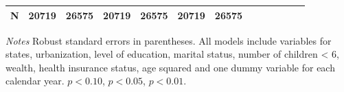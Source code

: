 \documentclass[12pt,english]{article}
\begin{document}
\begin{table}[p]
\begin{center}
\begin{adjustbox}{max width=\linewidth}
\begin{threeparttable}
{\begin{tabular}{l*{6}{S S}}
 \midrule
						N         &    20719         &    26575         &    20719         &    26575         &    20719         &    26575         \\
						\bottomrule
					\end{tabular}
					\begin{tablenotes}
						\item \footnotesize \textit{Notes} Robust standard errors in parentheses. All models include variables for  states, urbanization, level of education, marital status, number of children < 6, wealth, health insurance status, age squared and one dummy variable for each calendar year. \sym{*} \(p<0.10\), \sym{**} \(p<0.05\), \sym{***} \(p<0.01\).
					\end{tablenotes}
				}
			\end{threeparttable}
		\end{adjustbox}
	\end{center}
\end{table} 

\clearpage
\end{document}
